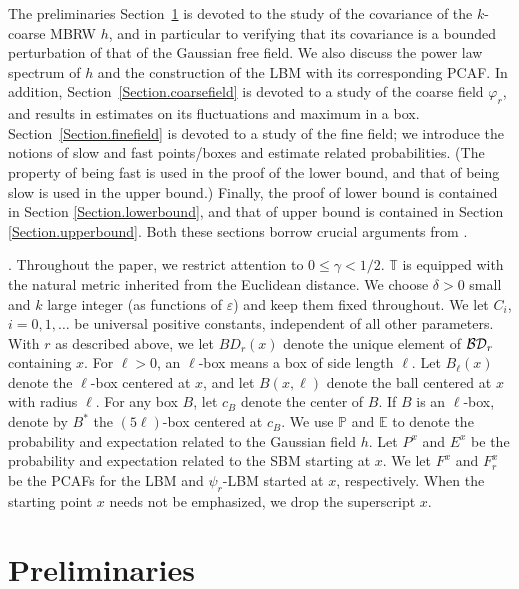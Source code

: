 \documentclass[11pt]{article}
\theoremstyle{definition}
\def \BD {{\cal BD}}
\def \e {\varepsilon}
\def \d {\delta}
\def \E {{\mathbb{E}}}
\def \P {{\mathbb{P}}}
\def \T {{\mathbb{T}}}
\begin{document}
\medskip

The preliminaries Section~\ref{Section.construction} is devoted to
the study of the covariance of the $k$-coarse MBRW $h$,
and in particular to verifying
that its covariance is a bounded perturbation of that of the Gaussian free field. We also discuss the power law spectrum of $h$  and the construction of the LBM with its corresponding PCAF.
In addition, Section~\ref{Section.coarsefield} is devoted to a study of
the coarse field $\varphi_r$, and results in estimates on its
fluctuations and maximum in a box.
Section~\ref{Section.finefield} is devoted to a study of the fine field; we introduce the
notions of slow and fast points/boxes and estimate related probabilities.
 (The property of being fast is used in the proof of the
 lower bound, and that of being slow is used in the upper bound.)
Finally, the proof of lower bound is contained
in Section
\ref{Section.lowerbound},
and that of upper bound is contained in Section
\ref{Section.upperbound}. Both these sections borrow crucial arguments from \cite{DZ15}.

\medskip

. Throughout the paper, we restrict attention to
$0 \le \gamma < 1/ 2$.  $\T$ is equipped with the natural metric inherited from the Euclidean distance.
We choose $\d>0$ small and $k$ large integer (as functions of $\e$)
and keep them fixed throughout.
We let $C_i$, $i=0,1,\dots$  be universal positive constants, independent of
all other parameters. With $r$ as described above, we let $BD_r (x)$ denote
the unique element of $\BD_r$ containing $x$. For $\ell > 0$, an $\ell$-box means a box of side length $\ell$. Let $B_\ell (x)$ denote the $\ell$-box centered at $x$, and let $B(x, \ell)$ denote
the ball centered at $x$ with radius $\ell$. For any box $B$, let
$c_B$ denote the center of $B$. If $B$ is an $\ell$-box, denote by $B^{*}$ the $(5 \ell)$-box centered at $c_B$.
We use $\P$ and $\E$ to denote the probability and expectation related to
the Gaussian field $h$. Let $P^x$ and $E^x$ be the probability and expectation related to the SBM starting at $x$. We let  $F^x$ and $F_r^x$ be the PCAFs
for the LBM and $\psi_r$-LBM started at $x$, respectively.
When the starting point $x$ needs not be emphasized,
we drop the superscript $x$.



\section{Preliminaries} \label{Section.construction}
\end{document}

